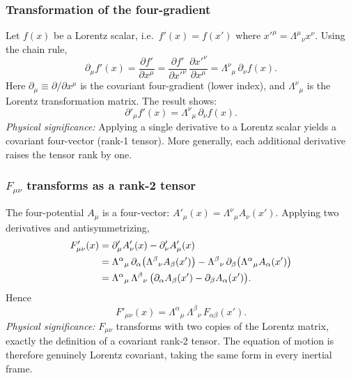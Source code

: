 \subsubsection*{Transformation of the four-gradient}

Let $f(x)$ be a Lorentz scalar, i.e.\ $f'(x) = f(x')$ where $x'^\mu = \Lambda^\mu{}_\nu x^\nu$.  Using the chain rule,
\begin{equation}
  \partial_\mu f'(x)
  = \frac{\partial f'}{\partial x^\mu}
  = \frac{\partial f'}{\partial x'^\nu}\,\frac{\partial x'^\nu}{\partial x^\mu}
  = \Lambda^\nu{}_\mu\,\partial_\nu f(x).
\end{equation}
Here $\partial_\mu \equiv \partial/\partial x^\mu$ is the covariant four-gradient (lower index), and $\Lambda^\nu{}_\mu$ is the Lorentz transformation matrix.  The result shows:
\begin{equation}\label{eq:grad-transform}
  \boxed{\partial'_\mu f'(x) = \Lambda^\nu{}_\mu\,\partial_\nu f(x).}
\end{equation}
\textit{Physical significance:} Applying a single derivative to a Lorentz scalar yields a covariant four-vector (rank-1 tensor).  More generally, each additional derivative raises the tensor rank by one.

\subsubsection*{$F_{\mu\nu}$ transforms as a rank-2 tensor}

The four-potential $A_\mu$ is a four-vector: $A'_\mu(x) = \Lambda^\nu{}_\mu A_\nu(x')$.  Applying two derivatives and antisymmetrizing,
\begin{align}
  F'_{\mu\nu}(x) &= \partial'_\mu A'_\nu(x) - \partial'_\nu A'_\mu(x) \notag\\
  &= \Lambda^\alpha{}_\mu\,\partial_\alpha\bigl(\Lambda^\beta{}_\nu A_\beta(x')\bigr)
    - \Lambda^\beta{}_\nu\,\partial_\beta\bigl(\Lambda^\alpha{}_\mu A_\alpha(x')\bigr) \notag\\
  &= \Lambda^\alpha{}_\mu\,\Lambda^\beta{}_\nu\,
    \bigl(\partial_\alpha A_\beta(x') - \partial_\beta A_\alpha(x')\bigr).
\end{align}
Hence
\begin{equation}\label{eq:F-transform}
  \boxed{F'_{\mu\nu}(x) = \Lambda^\alpha{}_\mu\,\Lambda^\beta{}_\nu\,F_{\alpha\beta}(x').}
\end{equation}
\textit{Physical significance:} $F_{\mu\nu}$ transforms with two copies of the Lorentz matrix, exactly the definition of a covariant rank-2 tensor.  The equation of motion is therefore genuinely Lorentz covariant, taking the same form in every inertial frame.

